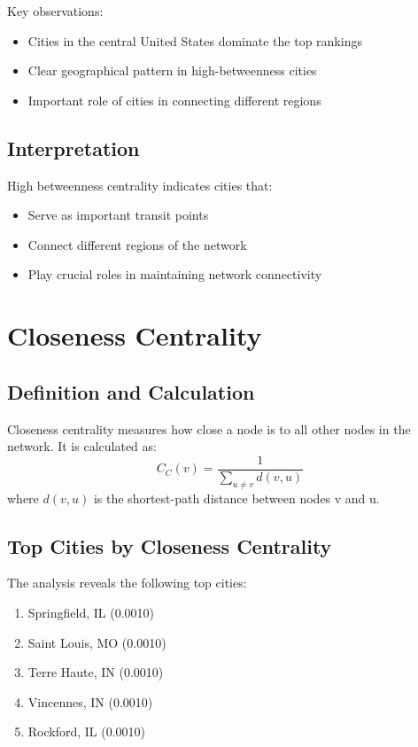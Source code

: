 Key observations:
\begin{itemize}
    \item Cities in the central United States dominate the top rankings
    \item Clear geographical pattern in high-betweenness cities
    \item Important role of cities in connecting different regions
\end{itemize}

\subsection{Interpretation}
High betweenness centrality indicates cities that:
\begin{itemize}
    \item Serve as important transit points
    \item Connect different regions of the network
    \item Play crucial roles in maintaining network connectivity
\end{itemize}

\section{Closeness Centrality}
\subsection{Definition and Calculation}
Closeness centrality measures how close a node is to all other nodes in the network. It is calculated as:
\begin{equation}
C_C(v) = \frac{1}{\sum_{u \neq v} d(v,u)}
\end{equation}
where $d(v,u)$ is the shortest-path distance between nodes v and u.

\subsection{Top Cities by Closeness Centrality}
The analysis reveals the following top cities:
\begin{enumerate}
    \item Springfield, IL (0.0010)
    \item Saint Louis, MO (0.0010)
    \item Terre Haute, IN (0.0010)
    \item Vincennes, IN (0.0010)
    \item Rockford, IL (0.0010)
\end{enumerate}

